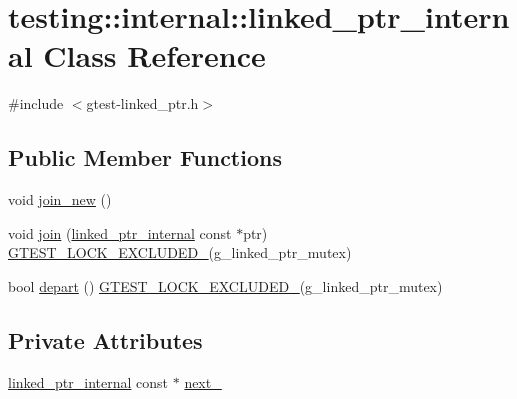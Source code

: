 \hypertarget{classtesting_1_1internal_1_1linked__ptr__internal}{}\section{testing\+::internal\+::linked\+\_\+ptr\+\_\+internal Class Reference}
\label{classtesting_1_1internal_1_1linked__ptr__internal}


{\ttfamily \#include $<$gtest-\/linked\+\_\+ptr.\+h$>$}

\subsection*{Public Member Functions}
\begin{DoxyCompactItemize}
\item 
void \mbox{\hyperlink{classtesting_1_1internal_1_1linked__ptr__internal_a742af1f65df2d5e2b7198a1b74264a83}{join\+\_\+new}} ()
\item 
void \mbox{\hyperlink{classtesting_1_1internal_1_1linked__ptr__internal_acd5a341459f7e81b10b4112d8c764e2a}{join}} (\mbox{\hyperlink{classtesting_1_1internal_1_1linked__ptr__internal}{linked\+\_\+ptr\+\_\+internal}} const $\ast$ptr) \mbox{\hyperlink{_obj__test_2lib_2googletest-release-1_88_81_2googletest_2include_2gtest_2internal_2gtest-port_8h_a69abff5a4efdd07bd5faebe3dd318d06}{G\+T\+E\+S\+T\+\_\+\+L\+O\+C\+K\+\_\+\+E\+X\+C\+L\+U\+D\+E\+D\+\_\+}}(g\+\_\+linked\+\_\+ptr\+\_\+mutex)
\item 
bool \mbox{\hyperlink{classtesting_1_1internal_1_1linked__ptr__internal_a8699e539d9702d363ef0351012d1b3ca}{depart}} () \mbox{\hyperlink{_obj__test_2lib_2googletest-release-1_88_81_2googletest_2include_2gtest_2internal_2gtest-port_8h_a69abff5a4efdd07bd5faebe3dd318d06}{G\+T\+E\+S\+T\+\_\+\+L\+O\+C\+K\+\_\+\+E\+X\+C\+L\+U\+D\+E\+D\+\_\+}}(g\+\_\+linked\+\_\+ptr\+\_\+mutex)
\end{DoxyCompactItemize}
\subsection*{Private Attributes}
\begin{DoxyCompactItemize}
\item 
\mbox{\hyperlink{classtesting_1_1internal_1_1linked__ptr__internal}{linked\+\_\+ptr\+\_\+internal}} const  $\ast$ \mbox{\hyperlink{classtesting_1_1internal_1_1linked__ptr__internal_ae4397a65a4d76a24547fcf2cd17131d8}{next\+\_\+}}
\end{DoxyCompactItemize}


